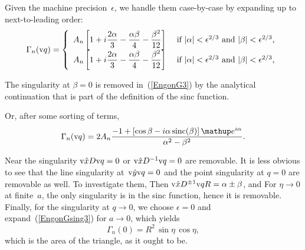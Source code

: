 Given the machine precision~$\epsilon$,
we handle them case-by-case
by expanding up to next-to-leading order:
\begin{equation}
  \Gamma_n(\text{v}{q}) = \left\{\begin{array}{ll}
  \displaystyle
  A_n\left[ 1 + i\frac{2\alpha}{3} - \frac{\alpha\beta}{4} - \frac{\beta^2}{12}
     \right]
  &\text{ if $|\alpha|<\epsilon^{2/3}$ and $|\beta|<\epsilon^{2/3}$,}\\
  \displaystyle
  A_n\left[ 1 + i\frac{2\alpha}{3} - \frac{\alpha\beta}{4} - \frac{\beta^2}{12}
     \right]
  &\text{ if $|\alpha|<\epsilon^{2/3}$ and $|\beta|<\epsilon^{2/3}$,}\\
  \end{array}\right.
\end{equation}

The singularity at $\beta=0$ is removed in~(\ref{EngonG3})
by the analytical continuation that is part of the definition
of the sinc function.

Or, after some sorting of terms,
\begin{equation}\label{EngonG3}
  \Gamma_n(\q) = 2 A_n
   \frac{ -1+\left[\cos\tqy
        -i\tqx\sinc(\tqy)\right]\e^{i\tqx}}
   {\tqx^2-\tqy^2}.
\end{equation}

Near the singularity
$\text{v}{\hat x} D\text{v}{q}=0$ or $\text{v}{\hat x} D^{-1}\text{v}{q}=0$ are removable.
It is less obvious to see that the line singularity at~$\text{v}{\hat y}\text{v}{q}=0$ and
the point singularity at $q=0$ are removable as well.
To investigate them,
Then $\text{v}{\hat x} D^{\pm1}\text{v}{q} R = \alpha\pm\beta$,
and
For $\eta\to0$ at finite~$a$, the only singularity is in the sinc function,
hence it is removable.
Finally, for the singularity at $q\to0$, we choose $\epsilon=0$ and
expand~(\ref{EngonGsing3}) for $a\to0$,
which yields
\begin{equation}
  \Gamma_n(0) = R^2\,\sin\eta\,\cos\eta,
\end{equation}
which is the area of the triangle, as it ought to be.

\iffalse
\section{Special functions near the removable singularity}

\index{Machine epsilon}
We assume a double-precision machine epsilon
of $\epsilon=2^{-52}\simeq2.2\cdot10^{-16}$.

\fi

